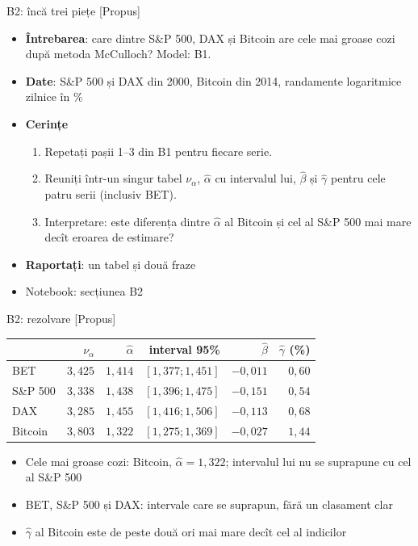\begin{frame}{B2: încă trei piețe [Propus]}
\itemsize{\footnotesize}
\begin{itemize}
\item \textbf{Întrebarea}: care dintre S\&P 500, DAX și Bitcoin are cele mai groase cozi după metoda McCulloch? Model: B1.
\item \textbf{Date}: S\&P 500 și DAX din 2000, Bitcoin din 2014, randamente logaritmice zilnice în \%
\item \textbf{Cerințe}
\begin{enumerate}
    \item Repetați pașii 1--3 din B1 pentru fiecare serie.
    \item Reuniți într-un singur tabel $\nu_\alpha$, $\hat\alpha$ cu intervalul lui, $\hat\beta$ și $\hat\gamma$ pentru cele patru serii (inclusiv BET).
    \item Interpretare: este diferența dintre $\hat\alpha$ al Bitcoin și cel al S\&P 500 mai mare decît eroarea de estimare?
\end{enumerate}
\item \textbf{Raportați}: un tabel și două fraze
\item Notebook: secțiunea B2
\end{itemize}
\end{frame}

\ifsolutions
\begin{frame}{B2: rezolvare [Propus]}
\itemsize{\footnotesize}
\begin{center}
\footnotesize
\begin{tabular}{lrrrrr}
\toprule
& $\nu_\alpha$ & $\hat\alpha$ & interval 95\% & $\hat\beta$ & $\hat\gamma$ (\%) \\
\midrule
BET & $3{,}425$ & $1{,}414$ & $[1{,}377; 1{,}451]$ & $-0{,}011$ & $0{,}60$ \\
S\&P 500 & $3{,}338$ & $1{,}438$ & $[1{,}396; 1{,}475]$ & $-0{,}151$ & $0{,}54$ \\
DAX & $3{,}285$ & $1{,}455$ & $[1{,}416; 1{,}506]$ & $-0{,}113$ & $0{,}68$ \\
Bitcoin & $3{,}803$ & $1{,}322$ & $[1{,}275; 1{,}369]$ & $-0{,}027$ & $1{,}44$ \\
\bottomrule
\end{tabular}
\end{center}
\begin{itemize}
    \item Cele mai groase cozi: Bitcoin, $\hat\alpha = 1{,}322$; intervalul lui nu se suprapune cu cel al S\&P 500
    \item BET, S\&P 500 și DAX: intervale care se suprapun, fără un clasament clar
    \item $\hat\gamma$ al Bitcoin este de peste două ori mai mare decît cel al indicilor
\end{itemize}
\end{frame}
\fi

